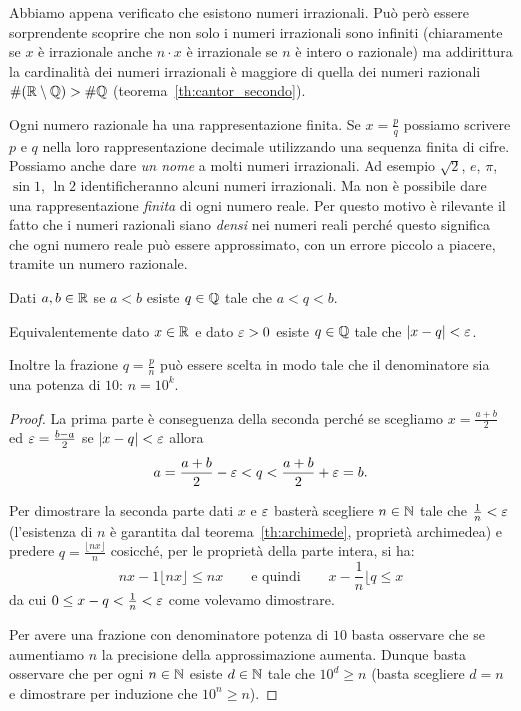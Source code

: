 Abbiamo appena verificato che esistono numeri irrazionali. 
Può però essere sorprendente scoprire che non solo i numeri irrazionali 
sono infiniti (chiaramente se $x$ è irrazionale anche $n\cdot x$ è irrazionale 
se $n$ è intero o razionale) ma addirittura la cardinalità 
dei numeri irrazionali è maggiore di quella dei numeri razionali 
$\# ({\mathbb R}\setminus {\mathbb Q}) > \# {\mathbb Q}$ (teorema~\ref{th:cantor_secondo}).

Ogni numero razionale ha una rappresentazione finita. 
Se $x=\frac p q$ possiamo scrivere $p$ e $q$ nella loro rappresentazione 
decimale utilizzando una sequenza finita di cifre.
Possiamo anche dare \emph{un nome} a molti numeri irrazionali. 
Ad esempio $\sqrt 2$, $e$, $\pi$, $\sin 1$, $\ln 2$ identificheranno 
alcuni numeri irrazionali. 
Ma non è possibile dare una rappresentazione \emph{finita} di ogni numero reale.
Per questo motivo è rilevante il fatto che i numeri razionali siano \emph{densi}
nei numeri reali perché questo significa che ogni numero reale può essere 
approssimato, con un errore piccolo a piacere, tramite un numero razionale.

\begin{theorem}[densità di $\QQ$ in $\RR$]
\label{th:densita_frazioni}%
%
%
Dati $a,b\in {\mathbb R}$ se $a<b$ esiste $q\in {\mathbb Q}$ tale che $a< q < b$.

Equivalentemente dato $x\in {\mathbb R}$ e dato $\varepsilon>0$ esiste $q\in {\mathbb Q}$ 
tale che ${\left|x-q\right|} < \varepsilon$.

Inoltre la frazione $q= \frac{p}{n}$ può essere scelta 
in modo tale che il denominatore sia una potenza di $10$: $n=10^k$.
\end{theorem}
\begin{proof}
La prima parte è conseguenza della seconda perché se scegliamo 
$x= \frac{a+b}{2}$ ed $\varepsilon = \frac{b-a} 2$ se ${\left|x-q\right|}< \varepsilon$ 
allora 
\[
   a = \frac{a+b}{2} - \varepsilon < q < \frac{a+b}{2} + \varepsilon = b.
\]

Per dimostrare la seconda parte dati $x$ e $\varepsilon$ basterà scegliere 
$n\in {\mathbb N}$ tale che $\frac 1 n < \varepsilon$ (l'esistenza di $n$ è garantita 
dal teorema~\ref{th:archimede}, proprietà archimedea) e predere $q = \frac{\lfloor nx\rfloor}{n}$
cosicché, per le proprietà della parte intera, si ha:
\[
  nx-1 \lfloor nx\rfloor \le nx 
  \qquad\text{e quindi}\qquad
  x - \frac 1 n \lfloor q \le x
\]
da cui $0 \le x-q < \frac 1 n < \varepsilon$ come volevamo dimostrare.

Per avere una frazione con denominatore potenza di $10$ basta osservare 
che se aumentiamo $n$ la precisione della approssimazione aumenta. 
Dunque basta osservare che per ogni $n\in {\mathbb N}$ esiste $d\in {\mathbb N}$
tale che $10^d \ge n$ (basta scegliere $d=n$ e dimostrare per induzione 
che $10^n\ge n$).
\end{proof}

